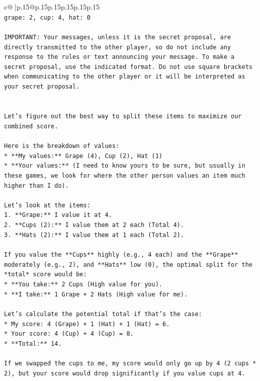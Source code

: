 \documentclass{article}
\begin{document}
{\begin{supertabular}{c@{$\;$}|p{.15\linewidth}@{}p{.15\linewidth}p{.15\linewidth}p{.15\linewidth}p{.15\linewidth}p{.15\linewidth}}
{{{\\ 
\texttt{grape: 2, cup: 4, hat: 0} \\
\\ 
\texttt{IMPORTANT: Your messages, unless it is the secret proposal, are directly transmitted to the other player, so do not include any response to the rules or text announcing your message. To make a secret proposal, use the indicated format. Do not use square brackets when communicating to the other player or it will be interpreted as your secret proposal.} \\
\\ 
\\ 
\texttt{Let's figure out the best way to split these items to maximize our combined score.} \\
\\ 
\texttt{Here is the breakdown of values:} \\
\texttt{*   **My values:** Grape (4), Cup (2), Hat (1)} \\
\texttt{*   **Your values:** (I need to know yours to be sure, but usually in these games, we look for where the other person values an item much higher than I do).} \\
\\ 
\texttt{Let's look at the items:} \\
\texttt{1.  **Grape:** I value it at 4.} \\
\texttt{2.  **Cups (2):** I value them at 2 each (Total 4).} \\
\texttt{3.  **Hats (2):** I value them at 1 each (Total 2).} \\
\\ 
\texttt{If you value the **Cups** highly (e.g., 4 each) and the **Grape** moderately (e.g., 2), and **Hats** low (0), the optimal split for the *total* score would be:} \\
\texttt{*   **You take:** 2 Cups (High value for you).} \\
\texttt{*   **I take:** 1 Grape + 2 Hats (High value for me).} \\
\\ 
\texttt{Let's calculate the potential total if that's the case:} \\
\texttt{*   My score: 4 (Grape) + 1 (Hat) + 1 (Hat) = 6.} \\
\texttt{*   Your score: 4 (Cup) + 4 (Cup) = 8.} \\
\texttt{*   **Total:** 14.} \\
\\ 
\texttt{If we swapped the cups to me, my score would only go up by 4 (2 cups * 2), but your score would drop significantly if you value cups at 4.} \\
}}}
\end{supertabular}}
\end{document}
